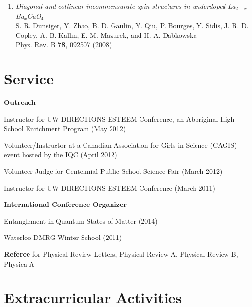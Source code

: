 \documentclass[letterpaper]{article}
\renewenvironment{itemize}{
  \begin{list}{}{
    \setlength{\leftmargin}{1.5em}
  }
}{
  \end{list}
}
\begin{document}
\begin{enumerate}
\item {\it Diagonal and collinear incommensurate spin structures in underdoped La$_{2-x}$Ba$_x$CuO$_4$} \\%
    S. R. Dunsiger, Y. Zhao, B. D. Gaulin, Y. Qiu, P. Bourges, Y. Sidis, J. R. D. Copley,  
  A. B. Kallin, E. M. Mazurek, and H. A. Dabkowska \\
Phys. Rev. B {\bf 78}, 092507 (2008) 
\end{enumerate}

\section*{Service}

\begin{itemize}

\item {\bf Outreach} 
	\begin{itemize}
	
	\item Instructor for UW DIRECTIONS ESTEEM Conference, an Aboriginal High School Enrichment Program (May 2012)
	\item Volunteer/Instructor at a Canadian Association for Girls in Science (CAGIS) event hosted by the IQC (April 2012)
	\item Volunteer Judge for Centennial Public School Science Fair (March 2012)
	\item Instructor for UW DIRECTIONS ESTEEM Conference (March 2011)
	\end{itemize}

\item {\bf International Conference Organizer}
	\begin{itemize}
	\item Entanglement in Quantum States of Matter (2014)
	\item Waterloo DMRG Winter School (2011)
	\end{itemize}
\item {\bf Referee} for Physical Review Letters, Physical Review A, Physical Review B, Physica A
\end{itemize}

\section*{Extracurricular Activities}
\end{document}
